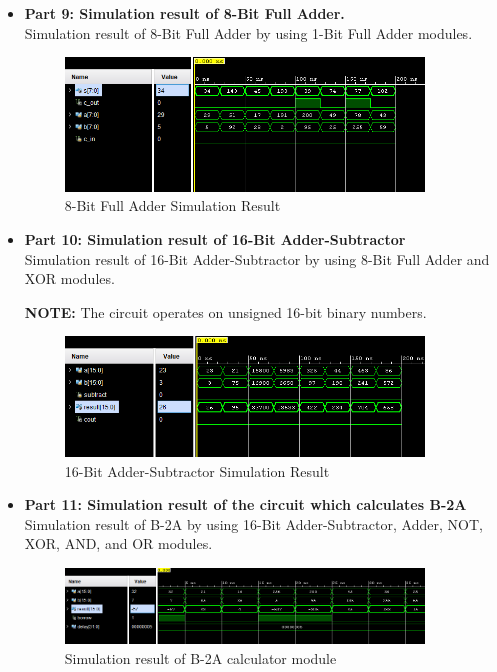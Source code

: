 \documentclass[pdftex,12pt,a4paper]{article}
\begin{document}
\begin{itemize}
    \item \textbf{Part 9: Simulation result of 8-Bit Full Adder.}\\
    Simulation result of 8-Bit Full Adder by using 1-Bit Full Adder modules.
    \begin{figure}[H]
    \centering
        \includegraphics[width=0.9\textwidth]{fulladder8.png}	
        \caption{8-Bit Full Adder Simulation Result}
        \label{fig1}
   \end{figure}
\end{itemize}
\begin{itemize}
    \item \textbf{Part 10: Simulation result of 16-Bit Adder-Subtractor}\\
    Simulation result of 16-Bit Adder-Subtractor by using 8-Bit Full Adder and XOR modules.

    \textbf{NOTE:} The circuit operates on unsigned 16-bit binary numbers.
    \begin{figure}[H]
    \centering
        \includegraphics[width=0.9\textwidth]{addersub.png}	
        \caption{16-Bit Adder-Subtractor Simulation Result}
        \label{fig1}
   \end{figure}
\end{itemize}
\begin{itemize}
    \item \textbf{Part 11: Simulation result of the circuit which calculates B-2A}\\
    Simulation result of B-2A by using 16-Bit Adder-Subtractor, Adder, NOT, XOR, AND, and OR modules.

    \begin{figure}[H]
    \centering
        \includegraphics[width=0.9\textwidth]{part11.png}	
        \caption{Simulation result of B-2A calculator module}
        \label{fig1}
   \end{figure}
\end{itemize}
\end{document}
